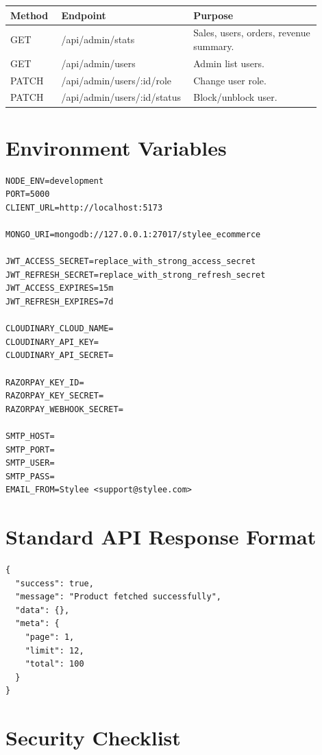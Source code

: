 \documentclass[11pt,a4paper]{article}
\begin{document}
\begin{longtable}{p{0.16\linewidth} p{0.34\linewidth} p{0.40\linewidth}}
\toprule
\textbf{Method} & \textbf{Endpoint} & \textbf{Purpose} \\
\midrule
GET & /api/admin/stats & Sales, users, orders, revenue summary. \\
GET & /api/admin/users & Admin list users. \\
PATCH & /api/admin/users/:id/role & Change user role. \\
PATCH & /api/admin/users/:id/status & Block/unblock user. \\
\bottomrule
\end{longtable}

\section{Environment Variables}

\begin{lstlisting}[style=code]
NODE_ENV=development
PORT=5000
CLIENT_URL=http://localhost:5173

MONGO_URI=mongodb://127.0.0.1:27017/stylee_ecommerce

JWT_ACCESS_SECRET=replace_with_strong_access_secret
JWT_REFRESH_SECRET=replace_with_strong_refresh_secret
JWT_ACCESS_EXPIRES=15m
JWT_REFRESH_EXPIRES=7d

CLOUDINARY_CLOUD_NAME=
CLOUDINARY_API_KEY=
CLOUDINARY_API_SECRET=

RAZORPAY_KEY_ID=
RAZORPAY_KEY_SECRET=
RAZORPAY_WEBHOOK_SECRET=

SMTP_HOST=
SMTP_PORT=
SMTP_USER=
SMTP_PASS=
EMAIL_FROM=Stylee <support@stylee.com>
\end{lstlisting}

\section{Standard API Response Format}

\begin{lstlisting}[style=code]
{
  "success": true,
  "message": "Product fetched successfully",
  "data": {},
  "meta": {
    "page": 1,
    "limit": 12,
    "total": 100
  }
}
\end{lstlisting}

\section{Security Checklist}
\end{document}
